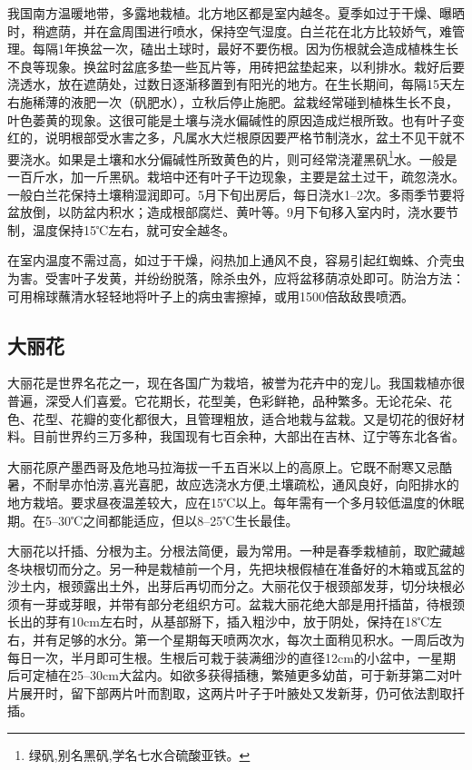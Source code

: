 \documentclass{ctexbook}
\begin{document}
我国南方温暖地带，多露地栽植。北方地区都是室内越冬。夏季如过于干燥、曝晒时，稍遮荫，并在盒周围进行喷水，保持空气湿度。白兰花在北方比较娇气，难管理。每隔1年换盆一次，磕出土球时，最好不要伤根。因为伤根就会造成植株生长不良等现象。换盆时盆底多垫一些瓦片等，用砖把盆垫起来，以利排水。栽好后要浇透水，放在遮荫处，过数日逐渐移置到有阳光的地方。在生长期间，每隔15天左右施稀薄的液肥一次（矾肥水），立秋后停止施肥。盆栽经常碰到植株生长不良，叶色萎黄的现象。这很可能是土壤与浇水偏碱性的原因造成烂根所致。也有叶子变红的，说明根部受水害之多，凡属水大烂根原因要严格节制浇水，盆土不见干就不要浇水。如果是土壤和水分偏碱性所致黄色的片，则可经常浇灌黑矾\footnote{绿矾,别名黑矾,学名七水合硫酸亚铁。}水。一般是一百斤水，加一斤黑矾。栽培中还有叶子干边现象，主要是盆土过干，疏忽浇水。一般白兰花保持土壤稍湿润即可。5月下旬出房后，每日浇水1--2次。多雨季节要将盆放倒，以防盆内积水；造成根部腐烂、黄叶等。9月下旬移入室内时，浇水要节制，温度保持15℃左右，就可安全越冬。

在室内温度不需过高，如过于干燥，闷热加上通风不良，容易引起红蜘蛛、介壳虫为害。受害叶子发黄，并纷纷脱落，除杀虫外，应将盆移荫凉处即可。防治方法：可用棉球蘸清水轻轻地将叶子上的病虫害擦掉，或用1500倍敌敌畏喷洒。

\subsection{大丽花}
大丽花是世界名花之一，现在各国广为栽培，被誉为花卉中的宠儿。我国栽植亦很普遍，深受人们喜爱。它花期长，花型美，色彩鲜艳，品种繁多。无论花朵、花色、花型、花瓣的变化都很大，且管理粗放，适合地栽与盆栽。又是切花的很好材料。目前世界约三万多种，我国现有七百余种，大部出在吉林、辽宁等东北各省。

大丽花原产墨西哥及危地马拉海拔一千五百米以上的高原上。它既不耐寒又忌酷暑，不耐旱亦怕涝,喜光喜肥，故应选浇水方便,土壤疏松，通风良好，向阳排水的地方栽培。要求昼夜温差较大，应在15℃以上。每年需有一个多月较低温度的休眠期。在5--30℃之间都能适应，但以8--25℃生长最佳。

大丽花以扦插、分根为主。分根法简便，最为常用。一种是春季栽植前，取贮藏越冬块根切而分之。另一种是栽植前一个月，先把块根假植在准备好的木箱或瓦盆的沙土内，根颈露出土外，出芽后再切而分之。大丽花仅于根颈部发芽，切分块根必须有一芽或芽眼，并带有部分老组织方可。盆栽大丽花绝大部是用扦插苗，待根颈长出的芽有10cm左右时，从基部掰下，插入粗沙中，放于阴处，保持在18℃左右，并有足够的水分。第一个星期每天喷两次水，每次土面稍见积水。一周后改为每日一次，半月即可生根。生根后可栽于装满细沙的直径12cm的小盆中，一星期后可定植在25--30cm大盆内。如欲多获得插穗，繁殖更多幼苗，可于新芽第二对叶片展开时，留下部两片叶而割取，这两片叶子于叶腋处又发新芽，仍可依法割取扦插。
\end{document}
